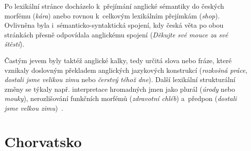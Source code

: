 Po lexikální stránce docházelo k~přejímání anglické sémantiky do českých morfému (\emph{kára}) anebo rovnou k~celkovým lexikálním přejímkám (\emph{shop}). Ovlivněna byla i~sémanticko-syntaktická spojení, kdy česká věta po obou stránkách přesně odpovídala anglickému spojení (\emph{Děkujte své mouce za své štěstí}).

Častým jevem byly taktéž anglické kalky, tedy určitá slova nebo fráze, které vznikaly doslovným překladem anglických jazykových konstrukcí (\emph{rozkošná práce}, \emph{dostali jsme velikou zimu} nebo \emph{čerstvý téhož dne}). Další lexikální strukturální změny se týkaly např. interpretace hromadných jmen jako plurál (\emph{úrody} nebo \emph{mouky}), nerozlišování funkčních morfémů (\emph{zdravotní chléb}) a~předpon (\emph{dostali jsme velkou zimu})~\parencite{amerika2017}.

\hypertarget{chorvatsko}{%
\section{Chorvatsko}\label{chorvatsko}}
